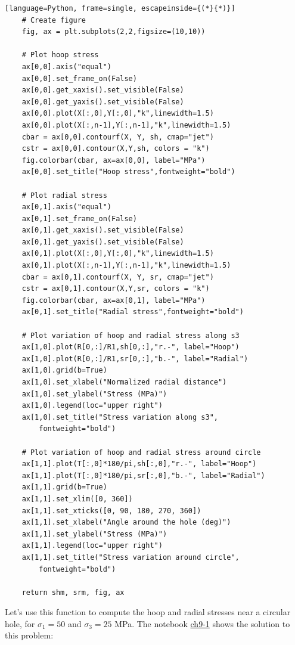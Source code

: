 \documentclass[a4paper , 12pt]{book}
\begin{document}
\begin{center}
\begin{lstlisting}[language=Python, frame=single, escapeinside={(*}{*)}]
	# Create figure
	fig, ax = plt.subplots(2,2,figsize=(10,10))
	
	# Plot hoop stress
	ax[0,0].axis("equal")
	ax[0,0].set_frame_on(False)
	ax[0,0].get_xaxis().set_visible(False)
	ax[0,0].get_yaxis().set_visible(False)	
	ax[0,0].plot(X[:,0],Y[:,0],"k",linewidth=1.5)
	ax[0,0].plot(X[:,n-1],Y[:,n-1],"k",linewidth=1.5)
	cbar = ax[0,0].contourf(X, Y, sh, cmap="jet")	 
	cstr = ax[0,0].contour(X,Y,sh, colors = "k")
	fig.colorbar(cbar, ax=ax[0,0], label="MPa")
	ax[0,0].set_title("Hoop stress",fontweight="bold")
	
	# Plot radial stress
	ax[0,1].axis("equal")
	ax[0,1].set_frame_on(False)
	ax[0,1].get_xaxis().set_visible(False)
	ax[0,1].get_yaxis().set_visible(False)	
	ax[0,1].plot(X[:,0],Y[:,0],"k",linewidth=1.5)
	ax[0,1].plot(X[:,n-1],Y[:,n-1],"k",linewidth=1.5)
	cbar = ax[0,1].contourf(X, Y, sr, cmap="jet")
	cstr = ax[0,1].contour(X,Y,sr, colors = "k")
	fig.colorbar(cbar, ax=ax[0,1], label="MPa")
	ax[0,1].set_title("Radial stress",fontweight="bold")
	
	# Plot variation of hoop and radial stress along s3
	ax[1,0].plot(R[0,:]/R1,sh[0,:],"r.-", label="Hoop")
	ax[1,0].plot(R[0,:]/R1,sr[0,:],"b.-", label="Radial")
	ax[1,0].grid(b=True)
	ax[1,0].set_xlabel("Normalized radial distance")
	ax[1,0].set_ylabel("Stress (MPa)")
	ax[1,0].legend(loc="upper right")
	ax[1,0].set_title("Stress variation along s3",
		fontweight="bold")
	
	# Plot variation of hoop and radial stress around circle
	ax[1,1].plot(T[:,0]*180/pi,sh[:,0],"r.-", label="Hoop")
	ax[1,1].plot(T[:,0]*180/pi,sr[:,0],"b.-", label="Radial")
	ax[1,1].grid(b=True)
	ax[1,1].set_xlim([0, 360])
	ax[1,1].set_xticks([0, 90, 180, 270, 360])
	ax[1,1].set_xlabel("Angle around the hole (deg)")
	ax[1,1].set_ylabel("Stress (MPa)")
	ax[1,1].legend(loc="upper right")
	ax[1,1].set_title("Stress variation around circle",
		fontweight="bold")
	
	return shm, srm, fig, ax
\end{lstlisting}
\end{center}

Let's use this function to compute the hoop and radial stresses near a circular hole, for $\sigma_1 = 50$ and $\sigma_3 = 25$ MPa. The notebook \href{https://github.com/nfcd/compGeo/blob/master/source/notebooks/ch9-1.ipynb}{ch9-1} shows the solution to this problem:
\end{document}
